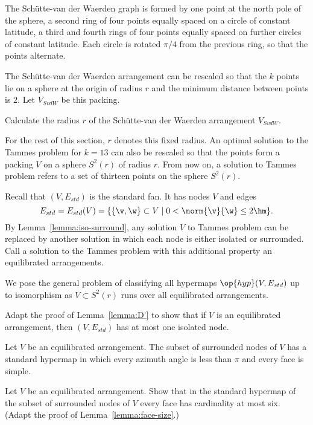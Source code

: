 The Sch\"utte-van der Waerden graph is formed by one point at the north
pole of the sphere, a second ring of four points equally spaced on a
circle of constant latitude, a third and fourth rings of four points
equally spaced on further circles of constant latitude.  Each circle
is rotated $\pi/4$ from the previous ring, so that the points
alternate.

The Sch\"utte-van der Waerden arrangement can be rescaled so that the
$k$ points lie on a sphere at the origin of radius $r$ and 
the minimum distance between points is $2$.  Let $V_{SvdW}$ be this
packing.

\begin{exer}
Calculate the radius $r$ of the Sch\"utte-van der Waerden arrangement $V_{SvdW}$.
\end{exer}

For the rest of this section, $r$ denotes this fixed radius.  An
optimal solution to the Tammes problem for $k=13$ can also be rescaled
so that the points form a packing $V$ on a sphere $S^2(r)$ of radius
$r$.  From now on, a solution to Tammes problem  refers to a set of
thirteen  points on the sphere $S^2(r)$.

Recall that $(V,E_{std})$ is the standard fan.  It has nodes $V$ and edges
\[
E_{std} = E_{std}(V) = \{\{\v,\w\}\subset V\mid 0 <
\norm{\v}{\w} \le 2\hm\}.
\]
By Lemma~\ref{lemma:iso-surround}, any solution $V$ to Tammes problem
can be replaced by another solution in which each node is either
isolated or surrounded.  Call a solution to the Tammes problem
with this additional property an equilibrated arrangements.


We pose the general problem of classifying
all hypermaps $\op{hyp}(V,E_{std})$ up to isomorphism as $V\subset
S^2(r)$ runs over all equilibrated arrangements.

\begin{exer}
  Adapt the proof of Lemma~\ref{lemma:D'} to show that if $V$ is an
  equilibrated arrangement, then $(V,E_{std})$ has at most one
  isolated node.
\end{exer}

Let $V$ be an equilibrated arrangement.   The subset
of surrounded nodes of $V$ has a standard hypermap in which every
azimuth angle is less than $\pi$ and every face is simple.

\begin{exer} 
  Let $V$ be an equilibrated arrangement.  Show that in the standard
  hypermap of the subset of surrounded nodes of $V$ every face has
  cardinality at most six.  (Adapt the proof of
  Lemma~\ref{lemma:face-size}.)
\end{exer}

